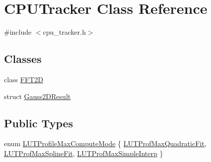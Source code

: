 \hypertarget{class_c_p_u_tracker}{}\section{C\+P\+U\+Tracker Class Reference}
\label{class_c_p_u_tracker}


{\ttfamily \#include $<$cpu\+\_\+tracker.\+h$>$}

\subsection*{Classes}
\begin{DoxyCompactItemize}
\item 
class \hyperlink{class_c_p_u_tracker_1_1_f_f_t2_d}{F\+F\+T2D}
\item 
struct \hyperlink{struct_c_p_u_tracker_1_1_gauss2_d_result}{Gauss2\+D\+Result}
\end{DoxyCompactItemize}
\subsection*{Public Types}
\begin{DoxyCompactItemize}
\item 
enum \hyperlink{class_c_p_u_tracker_a196ac690351a7a8449fe21012de9efdf}{L\+U\+T\+Profile\+Max\+Compute\+Mode} \{ \hyperlink{class_c_p_u_tracker_a196ac690351a7a8449fe21012de9efdfa699b606aff628359036eef4585adba0e}{L\+U\+T\+Prof\+Max\+Quadratic\+Fit}, 
\hyperlink{class_c_p_u_tracker_a196ac690351a7a8449fe21012de9efdfac91717f744a9d4cd4403cb334ed8f736}{L\+U\+T\+Prof\+Max\+Spline\+Fit}, 
\hyperlink{class_c_p_u_tracker_a196ac690351a7a8449fe21012de9efdfac33bc6099016f7da393c53fe4c7ecd5c}{L\+U\+T\+Prof\+Max\+Simple\+Interp}
 \}
\end{DoxyCompactItemize}
